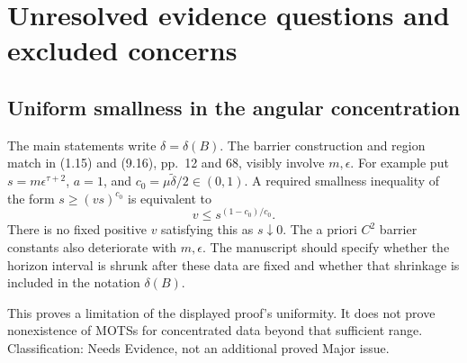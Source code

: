 \documentclass[10pt]{article}
\begin{document}
\section*{Unresolved evidence questions and excluded concerns}
\subsection*{Uniform smallness in the angular concentration}
The main statements write \(\delta=\delta(B)\). The barrier construction and region match in (1.15) and (9.16), pp. 12 and 68, visibly involve \(m,\epsilon\). For example put \(s=m\epsilon^{\tau+2}\), \(a=1\), and \(c_0=\mu\widetilde\delta/2\in(0,1)\). A required smallness inequality of the form \(s\ge(vs)^{c_0}\) is equivalent to \[v\le s^{(1-c_0)/c_0}.\] There is no fixed positive \(v\) satisfying this as \(s\downarrow0\). The a priori \(C^2\) barrier constants also deteriorate with \(m,\epsilon\). The manuscript should specify whether the horizon interval is shrunk after these data are fixed and whether that shrinkage is included in the notation \(\delta(B)\).\par
This proves a limitation of the displayed proof’s uniformity. It does not prove nonexistence of MOTSs for concentrated data beyond that sufficient range. Classification: Needs Evidence, not an additional proved Major issue.\par
\end{document}
